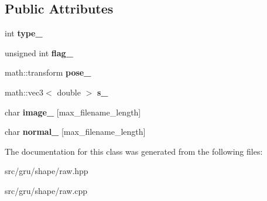 \subsection*{\-Public \-Attributes}
\begin{DoxyCompactItemize}
\item 
\hypertarget{classglutpp_1_1shape_1_1raw__base_af7ed7c2efa3da8a0b6e87c6be135a1a4}{int {\bfseries type\-\_\-}}\label{classglutpp_1_1shape_1_1raw__base_af7ed7c2efa3da8a0b6e87c6be135a1a4}

\item 
\hypertarget{classglutpp_1_1shape_1_1raw__base_ad5720e2c69804c5780d46f9d684ceea7}{unsigned int {\bfseries flag\-\_\-}}\label{classglutpp_1_1shape_1_1raw__base_ad5720e2c69804c5780d46f9d684ceea7}

\item 
\hypertarget{classglutpp_1_1shape_1_1raw__base_a9da66ac0ae5f2548046d5ec083a30113}{math\-::transform {\bfseries pose\-\_\-}}\label{classglutpp_1_1shape_1_1raw__base_a9da66ac0ae5f2548046d5ec083a30113}

\item 
\hypertarget{classglutpp_1_1shape_1_1raw__base_a8d1175e0747b91481c7b74f58b6f7046}{math\-::vec3$<$ double $>$ {\bfseries s\-\_\-}}\label{classglutpp_1_1shape_1_1raw__base_a8d1175e0747b91481c7b74f58b6f7046}

\item 
\hypertarget{classglutpp_1_1shape_1_1raw__base_adee4f2b32fb589e42335c71de5eea6ad}{char {\bfseries image\-\_\-} \mbox{[}max\-\_\-filename\-\_\-length\mbox{]}}\label{classglutpp_1_1shape_1_1raw__base_adee4f2b32fb589e42335c71de5eea6ad}

\item 
\hypertarget{classglutpp_1_1shape_1_1raw__base_a1bc85077b2981960c6cde84df7af92c9}{char {\bfseries normal\-\_\-} \mbox{[}max\-\_\-filename\-\_\-length\mbox{]}}\label{classglutpp_1_1shape_1_1raw__base_a1bc85077b2981960c6cde84df7af92c9}

\end{DoxyCompactItemize}


\-The documentation for this class was generated from the following files\-:\begin{DoxyCompactItemize}
\item 
src/gru/shape/raw.\-hpp\item 
src/gru/shape/raw.\-cpp\end{DoxyCompactItemize}
